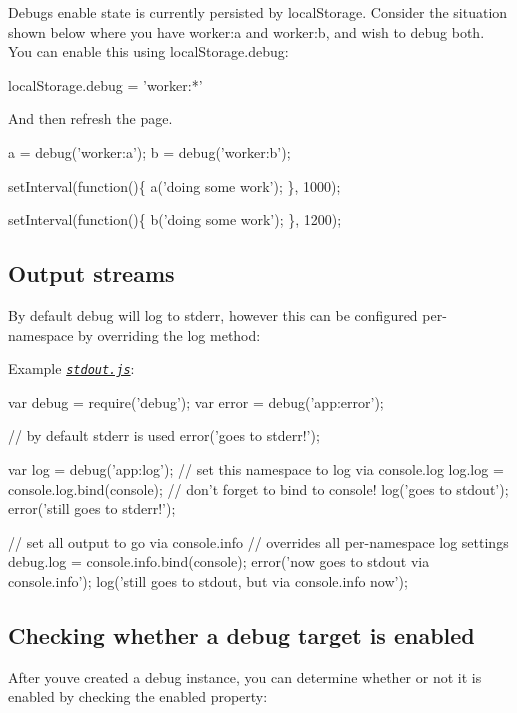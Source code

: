 Debug\textquotesingle{}s enable state is currently persisted by {\ttfamily local\+Storage}. Consider the situation shown below where you have {\ttfamily worker\+:a} and {\ttfamily worker\+:b}, and wish to debug both. You can enable this using {\ttfamily local\+Storage.\+debug}\+:


\begin{DoxyCode}
localStorage.debug = 'worker:*'
\end{DoxyCode}


And then refresh the page.


\begin{DoxyCode}
a = debug('worker:a');
b = debug('worker:b');

setInterval(function()\{
  a('doing some work');
\}, 1000);

setInterval(function()\{
  b('doing some work');
\}, 1200);
\end{DoxyCode}


\subsection*{Output streams}

By default {\ttfamily debug} will log to stderr, however this can be configured per-\/namespace by overriding the {\ttfamily log} method\+:

Example \href{./examples/node/stdout.js}{\tt {\itshape stdout.\+js}}\+:


\begin{DoxyCode}
var debug = require('debug');
var error = debug('app:error');

// by default stderr is used
error('goes to stderr!');

var log = debug('app:log');
// set this namespace to log via console.log
log.log = console.log.bind(console); // don't forget to bind to console!
log('goes to stdout');
error('still goes to stderr!');

// set all output to go via console.info
// overrides all per-namespace log settings
debug.log = console.info.bind(console);
error('now goes to stdout via console.info');
log('still goes to stdout, but via console.info now');
\end{DoxyCode}


\subsection*{Checking whether a debug target is enabled}

After you\textquotesingle{}ve created a debug instance, you can determine whether or not it is enabled by checking the {\ttfamily enabled} property\+:


